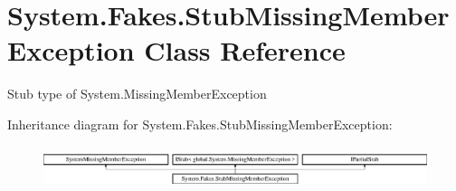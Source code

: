 \hypertarget{class_system_1_1_fakes_1_1_stub_missing_member_exception}{\section{System.\-Fakes.\-Stub\-Missing\-Member\-Exception Class Reference}
\label{class_system_1_1_fakes_1_1_stub_missing_member_exception}
}


Stub type of System.\-Missing\-Member\-Exception 


Inheritance diagram for System.\-Fakes.\-Stub\-Missing\-Member\-Exception\-:\begin{figure}[H]
\begin{center}
\leavevmode
\includegraphics[height=1.252796cm]{class_system_1_1_fakes_1_1_stub_missing_member_exception}
\end{center}
\end{figure}
